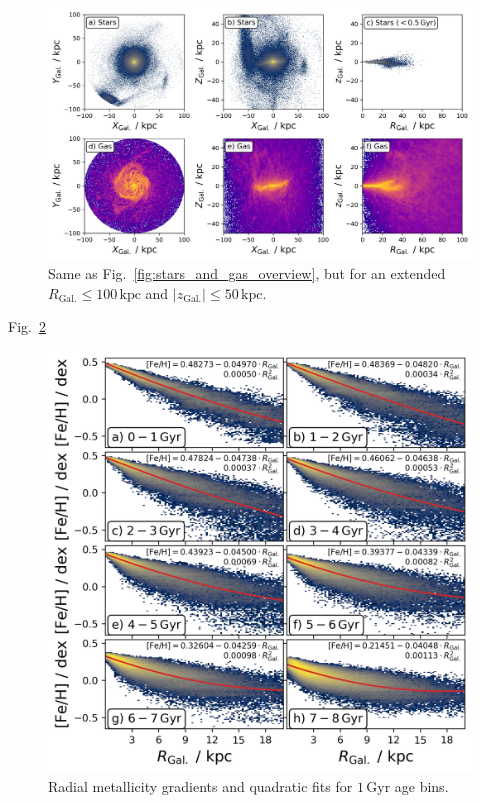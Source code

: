 \documentclass[fleqn,usenatbib]{mnras}
\begin{document}
\begin{figure}
    \centering
    \includegraphics[width=\textwidth]{figures/stars_and_gas_overview_100kpc.png}
    \caption{Same as Fig.~\ref{fig:stars_and_gas_overview}, but for an extended $R_\mathrm{Gal.} \leq 100\,\mathrm{kpc}$ and $\vert z_\mathrm{Gal.} \vert \leq 50\,\mathrm{kpc}$.}
    \label{fig:stars_and_gas_overview_100kpc}
\end{figure}

Fig.~\ref{fig:quadratic_fit_across_ages}

\begin{figure}
    \centering
    \includegraphics[width=\columnwidth]{figures/quadratic_fit_across_ages.png}
    \caption{Radial metallicity gradients and quadratic fits for $1\,\mathrm{Gyr}$ age bins.}
    \label{fig:quadratic_fit_across_ages}
\end{figure}


\bsp	%
\label{lastpage}
\end{document}
